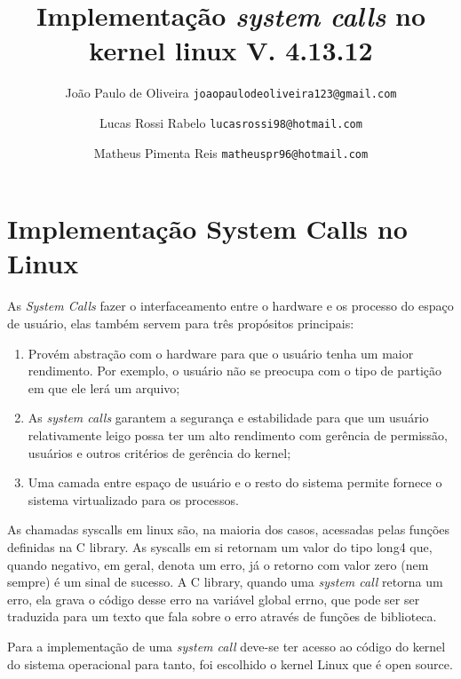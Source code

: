 \documentclass[12pt]{article}
\begin{document}
\title{Implementação \textit{system calls} no kernel linux V. 4.13.12\vspace{3.5cm}} %

\author{
	João Paulo de Oliveira
	\texttt{joaopaulodeoliveira123@gmail.com}
	\and
	Lucas Rossi Rabelo
	\texttt{lucasrossi98@hotmail.com}
	\and		
	Matheus Pimenta Reis
	\texttt{matheuspr96@hotmail.com}
	\vspace*{9cm}
}

\maketitle
\tableofcontents

\pagebreak
\section*{Implementação \textbf{System Calls} no Linux}
As \textit{System Calls} fazer o interfaceamento entre o hardware e os processo do espaço de usuário, elas também servem para três propósitos principais:
\begin{enumerate}
	\item Provém abstração com o hardware para que o usuário tenha um maior rendimento. Por exemplo, o usuário não se preocupa com o tipo de partição em que ele lerá um arquivo;
	\item As \textit{system calls} garantem a segurança e estabilidade para que um usuário relativamente leigo possa ter um alto rendimento com gerência de permissão, usuários e outros critérios de gerência do kernel;
	\item Uma camada entre espaço de usuário e o resto do sistema permite fornece o sistema virtualizado para os processos.
\end{enumerate}
	As chamadas syscalls em linux são, na maioria dos casos, acessadas pelas funções definidas na C library. As syscalls em si retornam um valor do tipo long4 que, quando negativo, em geral, denota um erro, já o retorno com valor zero (nem sempre) é um sinal de sucesso. A C library, quando uma \textit{system call} retorna um erro, ela grava o código desse erro na variável global errno, que pode ser ser traduzida para um texto que fala sobre o erro através de funções de biblioteca.
	
	Para a implementação de uma \textit{system call} deve-se ter acesso ao código do kernel do sistema operacional para tanto, foi escolhido o kernel Linux que é open source.
\end{document}
